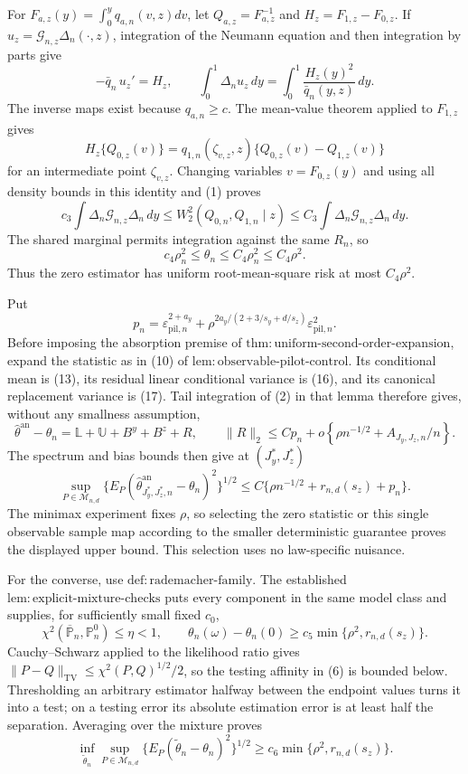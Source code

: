 For \(F_{a,z}(y)=\int_0^yq_{a,n}(v,z)dv\), let \(Q_{a,z}=F_{a,z}^{-1}\) and \(H_z=F_{1,z}-F_{0,z}\). If \(u_z=\mathcal G_{n,z}\Delta_n(\cdot,z)\), integration of the Neumann equation and then integration by parts give
\[
-\bar q_n\,u_z'=H_z,
\qquad \int_0^1\Delta_nu_z\,dy=\int_0^1\frac{H_z(y)^2}{\bar q_n(y,z)}\,dy. \tag{1}
\]
The inverse maps exist because \(q_{a,n}\ge c\). The mean-value theorem applied to \(F_{1,z}\) gives
\[
H_z\{Q_{0,z}(v)\}=q_{1,n}(\zeta_{v,z},z)\{Q_{0,z}(v)-Q_{1,z}(v)\}
\]
for an intermediate point \(\zeta_{v,z}\). Changing variables \(v=F_{0,z}(y)\) and using all density bounds in this identity and (1) proves
\[
c_3\int\Delta_n\mathcal G_{n,z}\Delta_n\,dy
\le W_2^2(Q_{0,n},Q_{1,n}\mid z)
\le C_3\int\Delta_n\mathcal G_{n,z}\Delta_n\,dy.                  \tag{2}
\]
The shared marginal permits integration against the same \(R_n\), so
\[
c_4\rho_n^2\le\theta_n\le C_4\rho_n^2\le C_4\rho^2.                \tag{3}
\]
Thus the zero estimator has uniform root-mean-square risk at most \(C_4\rho^2\).

Put
\[
p_n=\varepsilon_{\mathrm{pil},n}^{2+a_y}
+\rho^{2a_y/(2+3/s_y+d/s_z)}\varepsilon_{\mathrm{pil},n}^2.
\]
Before imposing the absorption premise of \(\mathrm{thm{:}uniform\text{-}second\text{-}order\text{-}expansion}\), expand the statistic as in (10) of \(\mathrm{lem{:}observable\text{-}pilot\text{-}control}\). Its conditional mean is (13), its residual linear conditional variance is (16), and its canonical replacement variance is (17). Tail integration of (2) in that lemma therefore gives, without any smallness assumption,
\[
\widehat\theta^{\mathrm{an}}-\theta_n=\mathbb L+\mathbb U+B^y+B^z+R,
\qquad
\|R\|_2\le Cp_n+o\!\left\{\rho n^{-1/2}+A_{J_y,J_z,n}/n\right\}.       \tag{4}
\]
The spectrum and bias bounds then give at \((J_y^*,J_z^*)\)
\[
\sup_{P\in\mathcal M_{n,d}}
\{E_P(\widehat\theta^{\mathrm{an}}_{J_y^*,J_z^*,n}-\theta_n)^2\}^{1/2}
\le C\{\rho n^{-1/2}+r_{n,d}(s_z)+p_n\}.                            \tag{5}
\]
The minimax experiment fixes \(\rho\), so selecting the zero statistic or this single observable sample map according to the smaller deterministic guarantee proves the displayed upper bound. This selection uses no law-specific nuisance.

For the converse, use \(\mathrm{def{:}rademacher\text{-}family}\). The established \(\mathrm{lem{:}explicit\text{-}mixture\text{-}checks}\) puts every component in the same model class and supplies, for sufficiently small fixed \(c_0\),
\[
\chi^2(\overline{\mathbb P}_n,\mathbb P_n^0)\le\eta<1,
\qquad \theta_n(\omega)-\theta_n(0)\ge c_5\min\{\rho^2,r_{n,d}(s_z)\}. \tag{6}
\]
Cauchy--Schwarz applied to the likelihood ratio gives \(\|P-Q\|_{\mathrm{TV}}\le\chi^2(P,Q)^{1/2}/2\), so the testing affinity in (6) is bounded below. Thresholding an arbitrary estimator halfway between the endpoint values turns it into a test; on a testing error its absolute estimation error is at least half the separation. Averaging over the mixture proves
\[
\inf_{\widetilde\theta_n}\sup_{P\in\mathcal M_{n,d}}
\{E_P(\widetilde\theta_n-\theta_n)^2\}^{1/2}
\ge c_6\min\{\rho^2,r_{n,d}(s_z)\}.                                 \tag{7}
\]

